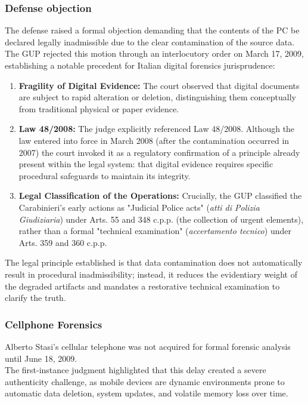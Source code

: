 \subsubsection*{Defense objection}
The defense raised a formal objection demanding that the contents of the PC be declared legally inadmissible due to the clear contamination of the source data.\\
The GUP rejected this motion through an interlocutory order on March 17, 2009, establishing a notable precedent for Italian digital forensics jurisprudence:
\begin{enumerate}
    \item \textbf{Fragility of Digital Evidence:} The court observed that digital documents are subject to rapid alteration or deletion, distinguishing them conceptually from traditional physical or paper evidence.
    \item \textbf{Law 48/2008:} The judge explicitly referenced Law 48/2008. Although the law entered into force in March 2008 (after the contamination occurred in 2007) the court invoked it as a regulatory confirmation of a principle already present within the legal system: that digital evidence requires specific procedural safeguards to maintain its integrity.
    \item \textbf{Legal Classification of the Operations:} Crucially, the GUP classified the Carabinieri's early actions as "Judicial Police acts" (\textit{atti di Polizia Giudiziaria}) under Arts. 55 and 348 c.p.p. (the collection of urgent elements), rather than a formal "technical examination" (\textit{accertamento tecnico}) under Arts. 359 and 360 c.p.p. 
\end{enumerate}
The legal principle established is that data contamination does not automatically result in procedural inadmissibility; instead, it reduces the evidentiary weight of the degraded artifacts and mandates a restorative technical examination to clarify the truth.

\subsubsection*{Cellphone Forensics}
Alberto Stasi's cellular telephone was not acquired for formal forensic analysis until June 18, 2009.\\
The first-instance judgment highlighted that this delay created a severe authenticity challenge, as mobile devices are dynamic environments prone to automatic data deletion, system updates, and volatile memory loss over time.
\medskip

